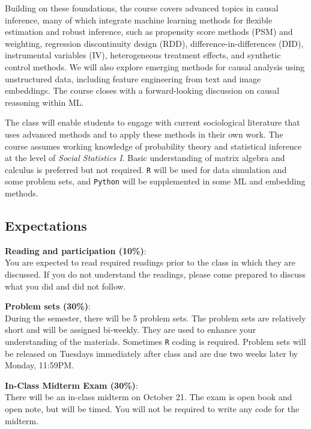 \documentclass[12pt]{article}
\begin{document}
Building on these foundations, the course covers advanced topics in causal inference, many of which integrate machine learning methods for flexible estimation and robust inference, such as propensity score methods (PSM) and weighting, regression discontinuity design (RDD), difference-in-differences (DID), instrumental variables (IV), heterogeneous treatment effects, and synthetic control methods. We will also explore emerging methods for causal analysis using unstructured data, including feature engineering from text and image embeddings. The course closes with a forward-looking discussion on causal reasoning within ML.

The class will enable students
to engage with current sociological literature that uses advanced methods and to apply these methods in their own work. The course assumes working knowledge of probability theory and statistical inference at the level of \textit{Social Statistics I}. Basic understanding of matrix algebra and calculus is preferred but not required. \texttt{R} will be used for data simulation and some problem sets, and \texttt{Python} will be supplemented in some ML and embedding methods.

\subsection*{Expectations}

\textbf{\textcolor{titlecolor}{Reading and participation (10\%)}}:\\
You are expected to read required readings prior to the class in which they are discussed. If you do not understand the readings, please come prepared to discuss what you did and did not follow.

\vspace{0.5em}

\noindent \textbf{\textcolor{titlecolor}{Problem sets (30\%)}}:\\
During the semester, there will be 5 problem sets. The problem sets are relatively short and will be assigned bi-weekly. They are used to enhance your understanding of the materials. Sometimes \texttt{R} coding is required. Problem sets will be released on Tuesdays immediately after class and are due two weeks later by Monday, 11:59PM.

\vspace{0.5em}

\noindent \textbf{\textcolor{titlecolor}{In-Class Midterm Exam (30\%)}}: \\
There will be an in-class midterm on October 21. The exam is open book and open note, but will be timed. You will not be required to write any code for the midterm.
\end{document}
